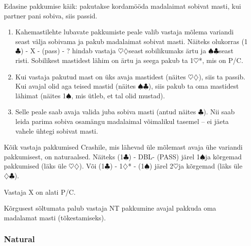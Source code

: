 \documentclass[10pt]{article}
\renewcommand{\c}{$\clubsuit$}
\renewcommand{\d}{$\diamondsuit$}
\newcommand{\h}{$\heartsuit$}
\newcommand{\s}{$\spadesuit$}
\newcommand{\x}{DBL}
\begin{document}
\begin{multicols*}{2}
Edasine pakkumise käik: pakutakse kordamööda madalaimat sobivat masti, kui partner pani sobiva, siis passid.
\begin{enumerate}
\item Kahemastilehte lubavate pakkumiste peale valib vastaja mõlema variandi seast välja sobivama ja pakub madalaimat sobivat masti. Näiteks olukorras (1\c) - X - (pass) - ? hindab vastaja \h\d seast sobilikumaks ärtu ja \s\c seast risti. Sobilikest mastidest lähim on ärtu ja seega pakub ta 1\h*, mis on P/C.
\item  Kui vastaja pakutud mast on üks avaja mastidest (näites \h\d), siis ta passib. Kui avajal olid aga teised mastid (näites \s\c), siis pakub ta oma mastidest lähimat (näites 1\s, mis ütleb, et tal olid mustad).
\item  Selle peale saab avaja valida juba sobiva masti (antud näites \c). Nii saab leida parima sobiva osamängu madalaimal võimalikul tasemel – ei jäeta vahele ühtegi sobivat masti.
\end{enumerate}
Kõik vastaja pakkumised Crashile, mis lähevad üle mõlemast avaja ühe variandi pakkumisest, on naturaalsed. Näiteks (1\c) - \x - (PASS) järel 1\s ja kõrgemad pakkumised (läks üle \h\d). Või (1\c) - 1\d* - (1\s) järel 2\h ja kõrgemad (läks üle \d\c).

Vastaja X on alati P/C.

Kõrgusest sõltumata palub vastaja NT pakkumine avajal pakkuda oma madalamat masti (tõkestamiseks).

\subsubsection{Natural}


\end{multicols*}
\end{document}
